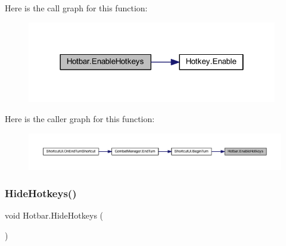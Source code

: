 Here is the call graph for this function\+:
\nopagebreak
\begin{figure}[H]
\begin{center}
\leavevmode
\includegraphics[width=310pt]{class_hotbar_a37bca03a1dfd144a30bae3774eaab667_cgraph}
\end{center}
\end{figure}
Here is the caller graph for this function\+:
\nopagebreak
\begin{figure}[H]
\begin{center}
\leavevmode
\includegraphics[width=350pt]{class_hotbar_a37bca03a1dfd144a30bae3774eaab667_icgraph}
\end{center}
\end{figure}
\mbox{\label{class_hotbar_a2f8af9863292223ae00d361121164160}} 
\subsubsection{\texorpdfstring{HideHotkeys()}{HideHotkeys()}}
{\footnotesize\ttfamily void Hotbar.\+Hide\+Hotkeys (\begin{DoxyParamCaption}{ }\end{DoxyParamCaption})}

